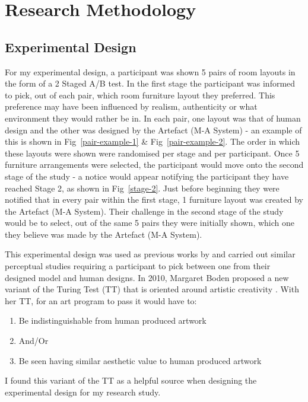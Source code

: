 \section{Research Methodology}


\subsection{Experimental Design}
For my experimental design, a participant was shown 5 pairs of room layouts in the form of a 2 Staged A/B test.
In the first stage the participant was informed to pick, out of each pair, which room furniture layout they preferred. This preference may have been influenced by realism, authenticity or what environment they would rather be in. In each pair, one layout was that of human design and the other was designed by the Artefact (M-A System) - an example of this is shown in Fig~\ref{pair-example-1} \& Fig~\ref{pair-example-2}. The order in which these layouts were shown were randomised per stage and per participant.
Once 5 furniture arrangements were selected, the participant would move onto the second stage of the study - a notice would appear notifying the participant they have reached Stage 2, as shown in Fig~\ref{stage-2}. Just before beginning they were notified that in every pair within the first stage, 1 furniture layout was created by the Artefact (M-A System). Their challenge in the second stage of the study would be to select, out of the same 5 pairs they were initially shown, which one they believe was made by the Artefact (M-A System).

This experimental design was used as previous works by  \cite{constrained-layouts} and  \cite{make-it-home} carried out similar perceptual studies requiring a participant to pick between one from their designed model and human designs. In 2010, Margaret Boden proposed a new variant of the Turing Test (TT) that is oriented around artistic creativity \cite{artistic-tt}. With her TT, for an art program to pass it would have to:
\begin{enumerate}
    \item Be indistinguishable from human produced artwork
    \item[]And/Or
    \item Be seen having similar aesthetic value to human produced artwork
\end{enumerate}
I found this variant of the TT as a helpful source when designing the experimental design for my research study.


